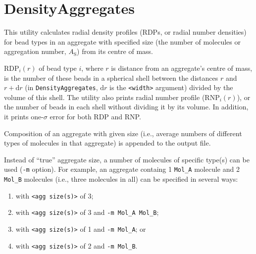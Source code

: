 \section{DensityAggregates} \label{sec:DensityAggregates}

This utility calculates radial density profiles (RDPs, or radial number
densities) for bead types in an aggregate with specified size (the number
of molecules or aggregation number, $A_{\mathrm{S}}$) from its centre of
mass.

RDP$_i(r)$ of bead type $i$, where $r$ is distance from an aggregate's
centre of mass, is the number of these beads in a spherical shell between
the distances $r$ and $r+\mathrm{d}r$ (in \texttt{DensityAggregates},
$\mathrm{d}r$ is the \texttt{<width>} argument) divided by the volume of
this shell. The utility also prints radial number profile (RNP$_i(r)$), or
the number of beads in each shell without dividing it by its volume. In
addition, it prints one-$\sigma$ error for both RDP and RNP.

Composition of an aggregate with given size (i.e., average numbers of
different types of molecules in that aggregate) is appended to the output
file.

Instead of \enquote{true} aggregate size, a number of molecules of specific type(s)
can be used (\texttt{-m} option). For example, an aggregate containg 1
\texttt{Mol\_A} molecule and 2 \texttt{Mol\_B} molecules (i.e., three
molecules in all) can be specified in several ways:
\begin{enumerate}[nosep]
  \item  with \texttt{<agg size(s)>} of 3;
  \item  with \texttt{<agg size(s)>} of 3 and \texttt{-m Mol\_A Mol\_B};
  \item  with \texttt{<agg size(s)>} of 1 and \texttt{-m Mol\_A}; or
  \item  with \texttt{<agg size(s)>} of 2 and \texttt{-m Mol\_B}.
\end{enumerate}

